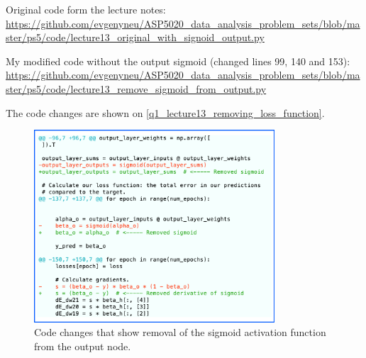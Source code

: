 Original code form the lecture notes: \\ \url{https://github.com/evgenyneu/ASP5020_data_analysis_problem_sets/blob/master/ps5/code/lecture13_original_with_signoid_output.py}

My modified code without the output sigmoid (changed lines 99, 140 and 153): \\ \url{https://github.com/evgenyneu/ASP5020_data_analysis_problem_sets/blob/master/ps5/code/lecture13_remove_sigmoid_from_output.py}

The code changes are shown on \autoref{q1_lecture13_removing_loss_function}.


\begin{figure}[!ht]
  \centering
  \includegraphics[width=0.8\textwidth]{figures/q1_lecture13_code_changes.png}
  \caption{Code changes that show removal of the sigmoid activation function from the output node.}
  \label{q1_lecture13_removing_loss_function}
\end{figure}







